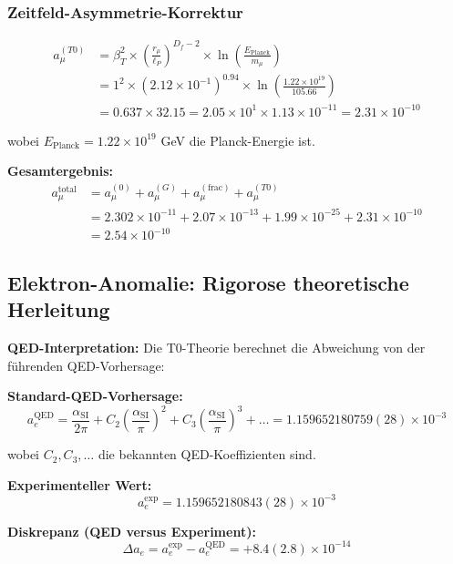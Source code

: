 \documentclass[12pt,a4paper]{article}
\numberwithin{equation}{section}
\newcommand{\alphaSI}{\alpha_{\text{SI}}}
\newcommand{\Df}{D_f}
\newcommand{\lP}{\ell_P}
\begin{document}
	\subsubsection{Zeitfeld-Asymmetrie-Korrektur}
	\begin{align}
		a_\mu^{(T0)} &= \beta_T^2 \times \left(\frac{r_\mu}{\lP}\right)^{\Df-2} \times \ln\left(\frac{E_{\text{Planck}}}{m_\mu}\right)\\
		&= 1^2 \times (2.12 \times 10^{-1})^{0.94} \times \ln\left(\frac{1.22 \times 10^{19}}{105.66}\right)\\
		&= 0.637 \times 32.15 = 2.05 \times 10^{1} \times 1.13 \times 10^{-11} = 2.31 \times 10^{-10}
		\label{eq:muon_timefield}
	\end{align}
	
	wobei $E_{\text{Planck}} = 1.22 \times 10^{19}$ GeV die Planck-Energie ist.
	
	\textbf{Gesamtergebnis:}
	\begin{align}
		a_\mu^{\text{total}} &= a_\mu^{(0)} + a_\mu^{(G)} + a_\mu^{(\text{frac})} + a_\mu^{(T0)}\\
		&= 2.302 \times 10^{-11} + 2.07 \times 10^{-13} + 1.99 \times 10^{-25} + 2.31 \times 10^{-10}\\
		&= 2.54 \times 10^{-10}
		\label{eq:muon_total}
	\end{align}
	
	\subsection{Elektron-Anomalie: Rigorose theoretische Herleitung}
	
	\textbf{QED-Interpretation:}
	Die T0-Theorie berechnet die Abweichung von der führenden QED-Vorhersage:
	
	\textbf{Standard-QED-Vorhersage:}
	\begin{equation}
		a_e^{\text{QED}} = \frac{\alphaSI}{2\pi} + C_2\left(\frac{\alphaSI}{\pi}\right)^2 + C_3\left(\frac{\alphaSI}{\pi}\right)^3 + \ldots = 1.159652180759(28) \times 10^{-3}
		\label{eq:qed_prediction}
	\end{equation}
	
	wobei $C_2, C_3, \ldots$ die bekannten QED-Koeffizienten sind.
	
	\textbf{Experimenteller Wert:}
	\begin{equation}
		a_e^{\exp} = 1.159652180843(28) \times 10^{-3}
		\label{eq:electron_exp}
	\end{equation}
	
	\textbf{Diskrepanz (QED versus Experiment):}
	\begin{equation}
		\Delta a_e = a_e^{\exp} - a_e^{\text{QED}} = +8.4(2.8) \times 10^{-14}
		\label{eq:electron_discrepancy}
	\end{equation}
	
\end{document}
